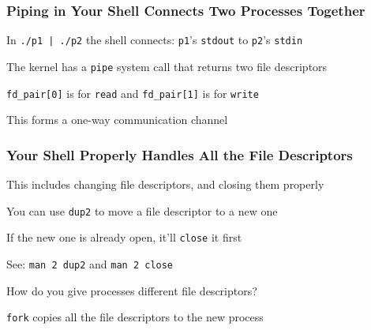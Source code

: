   \begin{frame}
    \frametitle{Piping in Your Shell Connects Two Processes Together}

    In \texttt{./p1 | ./p2} the shell connects:
    \texttt{p1}'s \texttt{stdout} to \texttt{p2}'s \texttt{stdin}

    \vspace{2em}

    The kernel has a \texttt{pipe} system call that returns two file descriptors

    \hspace{2em} \texttt{fd\_pair[0]} is for \texttt{read} and
    \texttt{fd\_pair[1]} is for \texttt{write}

    \vspace{2em}

    This forms a one-way communication channel
  \end{frame}

  \begin{frame}
    \frametitle{Your Shell Properly Handles All the File Descriptors}

    This includes changing file descriptors, and closing them properly

    \vspace{2em}

    You can use \texttt{dup2} to move a file descriptor to a new one

    \hspace{2em} If the new one is already open, it'll \texttt{close} it first

    \vspace{2em}
    
    See: \texttt{man 2 dup2} and \texttt{man 2 close}

    \vspace{2em}

    How do you give processes different file descriptors?

    \hspace{2em} \texttt{fork} copies all the file descriptors to the new process
  \end{frame}

